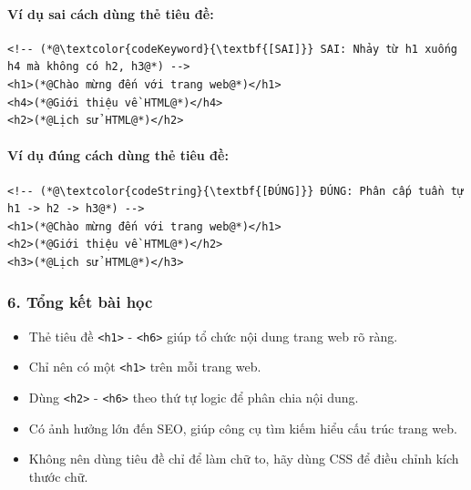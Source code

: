 \documentclass[11pt,oneside]{book}
\newcommand{\codeinline}[1]{\textcolor{accentOrange}{\texttt{#1}}}
\begin{document}
\paragraph{Ví dụ sai cách dùng thẻ tiêu đề:}
\begin{codeWindow}
\begin{lstlisting}[language=HTML5]
<!-- (*@\textcolor{codeKeyword}{\textbf{[SAI]}} SAI: Nhảy từ h1 xuống h4 mà không có h2, h3@*) -->
<h1>(*@Chào mừng đến với trang web@*)</h1>
<h4>(*@Giới thiệu về HTML@*)</h4>
<h2>(*@Lịch sử HTML@*)</h2>
\end{lstlisting}
\end{codeWindow}

\paragraph{Ví dụ đúng cách dùng thẻ tiêu đề:}
\begin{codeWindow}
\begin{lstlisting}[language=HTML5]
<!-- (*@\textcolor{codeString}{\textbf{[ĐÚNG]}} ĐÚNG: Phân cấp tuần tự h1 -> h2 -> h3@*) -->
<h1>(*@Chào mừng đến với trang web@*)</h1>
<h2>(*@Giới thiệu về HTML@*)</h2>
<h3>(*@Lịch sử HTML@*)</h3>
\end{lstlisting}
\end{codeWindow}

\subsubsection{6. Tổng kết bài học}

\begin{noteBox}
\begin{itemize}[leftmargin=1.5em, itemsep=2pt, parsep=0pt]
    \item Thẻ tiêu đề \codeinline{<h1>} - \codeinline{<h6>} giúp tổ chức nội dung trang web rõ ràng.
    \item Chỉ nên có một \codeinline{<h1>} trên mỗi trang web.
    \item Dùng \codeinline{<h2>} - \codeinline{<h6>} theo thứ tự logic để phân chia nội dung.
    \item Có ảnh hưởng lớn đến SEO, giúp công cụ tìm kiếm hiểu cấu trúc trang web.
    \item Không nên dùng tiêu đề chỉ để làm chữ to, hãy dùng CSS để điều chỉnh kích thước chữ.
\end{itemize}
\end{noteBox}
\end{document}
